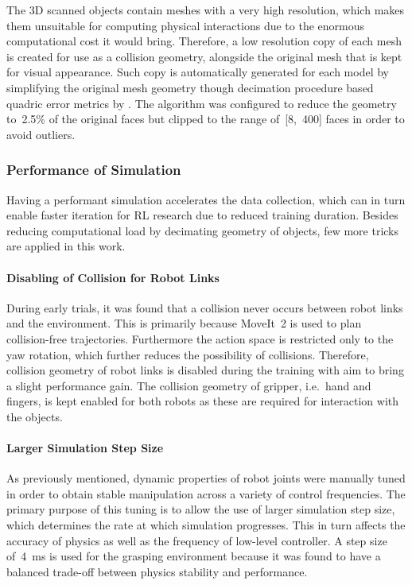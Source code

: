 The 3D scanned objects contain meshes with a very high resolution, which makes them unsuitable for computing physical interactions due to the enormous computational cost it would bring. Therefore, a low resolution copy of each mesh is created for use as a collision geometry, alongside the original mesh that is kept for visual appearance. Such copy is automatically generated for each model by simplifying the original mesh geometry though decimation procedure based quadric error metrics by \citet{garland_surface_1997}. The algorithm was configured to reduce the geometry to~2.5\% of the original faces but clipped to the range of~[8,~400] faces in order to avoid outliers.


\subsubsection{Performance of Simulation}

Having a performant simulation accelerates the data collection, which can in turn enable faster iteration for RL research due to reduced training duration. Besides reducing computational load by decimating geometry of objects, few more tricks are applied in this work.

\paragraph{Disabling of Collision for Robot Links} During early trials, it was found that a collision never occurs between robot links and the environment. This is primarily because MoveIt~2 is used to plan collision-free trajectories. Furthermore the action space is restricted only to the yaw rotation, which further reduces the possibility of collisions. Therefore, collision geometry of robot links is disabled during the training with aim to bring a slight performance gain. The collision geometry of gripper, i.e.~hand and fingers, is kept enabled for both robots as these are required for interaction with the objects.

\paragraph{Larger Simulation Step Size} As previously mentioned, dynamic properties of robot joints were manually tuned in order to obtain stable manipulation across a variety of control frequencies. The primary purpose of this tuning is to allow the use of larger simulation step size, which determines the rate at which simulation progresses. This in turn affects the accuracy of physics as well as the frequency of low-level controller. A step size of~4~ms is used for the grasping environment because it was found to have a balanced trade-off between physics stability and performance.

